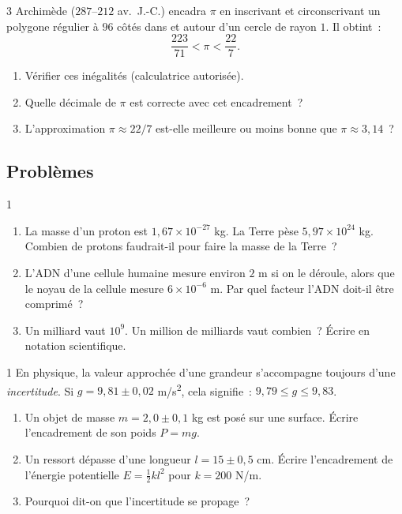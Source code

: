 \begin{exo}{3}
Archim\`ede ($287$--$212$ av.\ J.-C.) encadra $\pi$ en inscrivant et
circonscrivant un polygone r\'egulier \`a $96$ c\^ot\'es dans et autour
d'un cercle de rayon $1$. Il obtint~:
$$\frac{223}{71} < \pi < \frac{22}{7}.$$
\begin{enumerate}
  \item V\'erifier ces in\'egalit\'es (calculatrice autoris\'ee).
  \item Quelle d\'ecimale de $\pi$ est correcte avec cet encadrement~?
  \item L'approximation $\pi \approx 22/7$ est-elle meilleure ou moins
        bonne que $\pi \approx 3{,}14$~?
\end{enumerate}
\end{exo}

\subsection*{Probl\`emes}

\begin{probleme}{1}
\begin{enumerate}
  \item La masse d'un proton est $1{,}67\times10^{-27}$ kg.
        La Terre pèse $5{,}97\times10^{24}$ kg.
        Combien de protons faudrait-il pour faire la masse de la Terre~?
  \item L'ADN d'une cellule humaine mesure environ $2$ m si on le
        d\'eroule, alors que le noyau de la cellule mesure $6\times10^{-6}$ m.
        Par quel facteur l'ADN doit-il \^etre comprim\'e~?
  \item Un milliard vaut $10^9$. Un million de milliards vaut combien~?
        \'Ecrire en notation scientifique.
\end{enumerate}
\end{probleme}

\begin{probleme}{1}
En physique, la valeur approch\'ee d'une grandeur s'accompagne toujours
d'une \emph{incertitude}.
Si $g = 9{,}81 \pm 0{,}02$ m/s\textsuperscript{2}, cela signifie~:
$9{,}79 \leq g \leq 9{,}83$.
\begin{enumerate}
  \item Un objet de masse $m = 2{,}0 \pm 0{,}1$ kg est pos\'e sur une surface.
        \'Ecrire l'encadrement de son poids $P = mg$.
  \item Un ressort d\'epasse d'une longueur $l = 15 \pm 0{,}5$ cm.
        \'Ecrire l'encadrement de l'\'energie potentielle
        $E = \frac{1}{2}k l^2$ pour $k = 200$ N/m.
  \item Pourquoi dit-on que l'incertitude \og se propage\fg~?
\end{enumerate}
\end{probleme}

